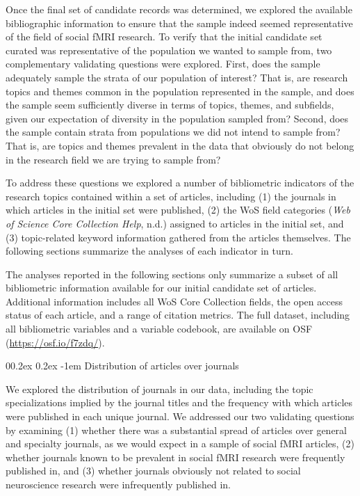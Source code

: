 \documentclass[
  man,floatsintext]{apa6}
\makeatletter
\let\oldparagraph\paragraph
\renewcommand{\paragraph}[1]{\oldparagraph{#1}\mbox{}}
\renewcommand{\paragraph}{\@startsection{paragraph}{4}{\parindent}%
  {0\baselineskip \@plus 0.2ex \@minus 0.2ex}%
  {-1em}%
  {\normalfont\normalsize\bfseries\itshape\typesectitle}}
\makeatother
\begin{document}
Once the final set of candidate records was determined, we explored the available bibliographic information to ensure that the sample indeed seemed representative of the field of social fMRI research. To verify that the initial candidate set curated was representative of the population we wanted to sample from, two complementary validating questions were explored. First, does the sample adequately sample the strata of our population of interest? That is, are research topics and themes common in the population represented in the sample, and does the sample seem sufficiently diverse in terms of topics, themes, and subfields, given our expectation of diversity in the population sampled from? Second, does the sample contain strata from populations we did not intend to sample from? That is, are topics and themes prevalent in the data that obviously do not belong in the research field we are trying to sample from?

To address these questions we explored a number of bibliometric indicators of the research topics contained within a set of articles, including (1) the journals in which articles in the initial set were published, (2) the WoS field categories (\emph{Web of {Science Core Collection Help}}, n.d.) assigned to articles in the initial set, and (3) topic-related keyword information gathered from the articles themselves. The following sections summarize the analyses of each indicator in turn.

The analyses reported in the following sections only summarize a subset of all bibliometric information available for our initial candidate set of articles. Additional information includes all WoS Core Collection fields, the open access status of each article, and a range of citation metrics. The full dataset, including all bibliometric variables and a variable codebook, are available on OSF (\url{https://osf.io/f7zdq/}).

\hypertarget{distribution-of-articles-over-journals}{%
\paragraph{Distribution of articles over journals}\label{distribution-of-articles-over-journals}}

We explored the distribution of journals in our data, including the topic specializations implied by the journal titles and the frequency with which articles were published in each unique journal. We addressed our two validating questions by examining (1) whether there was a substantial spread of articles over general and specialty journals, as we would expect in a sample of social fMRI articles, (2) whether journals known to be prevalent in social fMRI research were frequently published in, and (3) whether journals obviously not related to social neuroscience research were infrequently published in.
\end{document}

